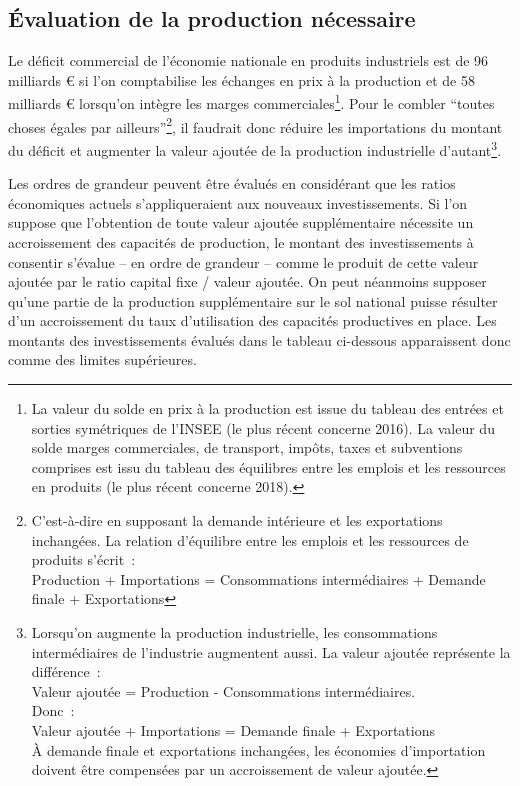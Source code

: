 \documentclass[a4paper]{article}
\begin{document}
\subsection{Évaluation de la production nécessaire}
Le déficit commercial de l’économie nationale en produits industriels est de 96 milliards € si l’on comptabilise les échanges en prix à la production et de 58 milliards € lorsqu’on intègre les marges commerciales\footnote{La valeur du solde en prix à la production est issue du tableau des entrées et sorties symétriques de l’INSEE (le plus récent concerne 2016). La valeur du solde marges commerciales, de transport, impôts, taxes et subventions comprises est issu du tableau des équilibres entre les emplois et les ressources en produits (le plus récent concerne 2018).}. Pour le combler “toutes choses égales par ailleurs”\footnote{C’est-à-dire en supposant la demande intérieure et les exportations inchangées. La relation d’équilibre entre les emplois et  les ressources de produits s’écrit~:\\
Production + Importations = Consommations intermédiaires + Demande finale + Exportations
}, il faudrait donc réduire les importations du montant du déficit et augmenter la valeur ajoutée de la production industrielle d’autant\footnote{Lorsqu’on augmente la production industrielle, les consommations intermédiaires de l’industrie augmentent aussi. La valeur ajoutée représente la différence~:\\
Valeur ajoutée = Production -  Consommations intermédiaires.\\
Donc~:\\
Valeur ajoutée + Importations = Demande finale + Exportations\\
À demande finale et exportations inchangées, les économies d’importation doivent être compensées par un accroissement de valeur ajoutée.
}.

Les ordres de grandeur peuvent être évalués en considérant que les ratios économiques actuels s’appliqueraient aux nouveaux investissements. Si l’on suppose que l’obtention de toute valeur ajoutée supplémentaire nécessite un accroissement des capacités de production, le montant des investissements à consentir s’évalue – en ordre de grandeur – comme le produit de cette valeur ajoutée par le ratio capital fixe / valeur ajoutée. On peut néanmoins supposer qu’une partie de la production supplémentaire sur le sol national puisse résulter d’un accroissement du taux d’utilisation des capacités productives en place. Les montants des investissements évalués dans le tableau ci-dessous apparaissent donc comme des limites supérieures.
\end{document}
